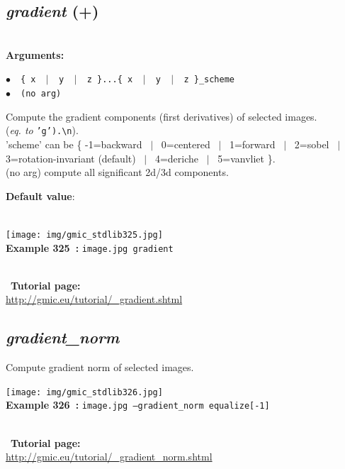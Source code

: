 \documentclass[a4paper,10.5pt,twoside]{book}
\def\comma{\discretionary{,}{}{,}}
\newcommand{\Cb}[1]{\textcolor{cb}{#1}}
\newcommand{\Cc}[1]{\textcolor{cc}{#1}}
\begin{document}
\subsection{\emph{gradient} (+)}\vspace*{-0.7em}
~\\\textbf{\Cb{Arguments: }}\begin{flushleft}
{\small \Cb{\hspace*{0.5cm}$\bullet$~~\texttt{\{ x ~$|$~ y ~$|$~ z \}...\{ x ~$|$~ y ~$|$~ z \}{\comma}\_scheme}}}~~~\\
{\small \Cb{\hspace*{0.5cm}$\bullet$~~\texttt{(no arg)}}}\end{flushleft}
Compute the gradient components (first derivatives) of selected images.
~\\(\emph{eq. to} {\small \texttt{'g').\textbackslash n}}).
~\\'scheme' can be \{ -1=backward ~$|$~ 0=centered ~$|$~ 1=forward ~$|$~ 2=sobel ~$|$~ 3=rotation-invariant (default) ~$|$~ 4=deriche ~$|$~ 5=vanvliet \}.
~\\(no arg) compute all significant 2d/3d components.
\begin{flushleft}\Cc{\textbf{Default value}:\\~\\\hspace*{0.5cm}{\small $\bullet$~~\texttt{'scheme=3'.}}}\end{flushleft}
\begin{center}\texttt{[image: img/gmic\_stdlib325.jpg]}\\
{\footnotesize \textbf{Example 325~:} \texttt{image.jpg gradient}}
\end{center}
~\\
~\textbf{Tutorial page: }\\\url{http://gmic.eu/tutorial/\_gradient.shtml}


\subsection{\emph{gradient\_norm} }\vspace*{-0.7em}
Compute gradient norm of selected images.
\begin{center}\texttt{[image: img/gmic\_stdlib326.jpg]}\\
{\footnotesize \textbf{Example 326~:} \texttt{image.jpg --gradient\_norm equalize[-1]}}
\end{center}
~\\
~\textbf{Tutorial page: }\\\url{http://gmic.eu/tutorial/\_gradient\_norm.shtml}
\end{document}
